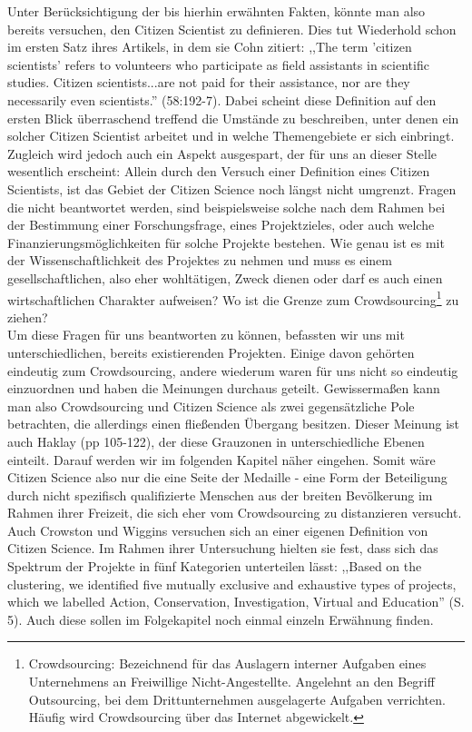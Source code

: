 \documentclass{article}
\begin{document}
Unter Berücksichtigung der bis hierhin erwähnten Fakten, könnte man also bereits versuchen, den Citizen Scientist zu definieren. Dies tut Wiederhold schon im ersten Satz ihres Artikels, in dem sie Cohn zitiert: ,,The term 'citizen scientists' refers to volunteers who participate as field assistants in scientific studies. Citizen scientists...are not paid for their assistance, nor are they necessarily even scientists.'' \cite{Cohn} (58:192-7). Dabei scheint diese Definition auf den ersten Blick überraschend treffend die Umstände zu beschreiben, unter denen ein solcher Citizen Scientist arbeitet und in welche Themengebiete er sich einbringt. Zugleich wird jedoch auch ein Aspekt ausgespart, der für uns an dieser Stelle wesentlich erscheint: Allein durch den Versuch einer Definition eines Citizen Scientists, ist das Gebiet der Citizen Science noch längst nicht umgrenzt. Fragen die nicht beantwortet werden, sind beispielsweise solche nach dem Rahmen bei der Bestimmung einer Forschungsfrage, eines Projektzieles, oder auch welche Finanzierungsmöglichkeiten für solche Projekte bestehen. Wie genau ist es mit der Wissenschaftlichkeit des Projektes zu nehmen und muss es einem gesellschaftlichen, also eher wohltätigen, Zweck dienen oder darf es auch einen wirtschaftlichen Charakter aufweisen? Wo ist die Grenze zum Crowdsourcing\footnote{Crowdsourcing: Bezeichnend für das Auslagern interner Aufgaben eines Unternehmens an Freiwillige Nicht-Angestellte. Angelehnt an den Begriff Outsourcing, bei dem Drittunternehmen ausgelagerte Aufgaben verrichten. Häufig wird Crowdsourcing über das Internet abgewickelt.} zu ziehen?\\
Um diese Fragen für uns beantworten zu können, befassten wir uns mit unterschiedlichen, bereits existierenden Projekten. Einige davon gehörten eindeutig zum Crowdsourcing, andere wiederum waren für uns nicht so eindeutig einzuordnen und haben die Meinungen durchaus geteilt. Gewissermaßen kann man also Crowdsourcing und Citizen Science als zwei gegensätzliche Pole betrachten, die allerdings einen fließenden Übergang besitzen. Dieser Meinung ist auch Haklay\cite{Haklay} (pp 105-122), der diese Grauzonen in unterschiedliche Ebenen einteilt. Darauf werden wir im folgenden Kapitel näher eingehen. Somit wäre Citizen Science also nur die eine Seite der Medaille - eine Form der Beteiligung durch nicht spezifisch qualifizierte Menschen aus der breiten Bevölkerung im Rahmen ihrer Freizeit, die sich eher vom Crowdsourcing zu distanzieren versucht.
\newline
Auch Crowston und Wiggins\cite{CW} versuchen sich an einer eigenen Definition von Citizen Science. Im Rahmen ihrer Untersuchung hielten sie fest, dass sich das Spektrum der Projekte in fünf Kategorien unterteilen lässt: ,,Based on the clustering, we identified five mutually exclusive and exhaustive types of projects, which we labelled Action, Conservation, Investigation, Virtual and Education'' (S. 5). Auch diese sollen im Folgekapitel noch einmal einzeln Erwähnung finden.
\end{document}
